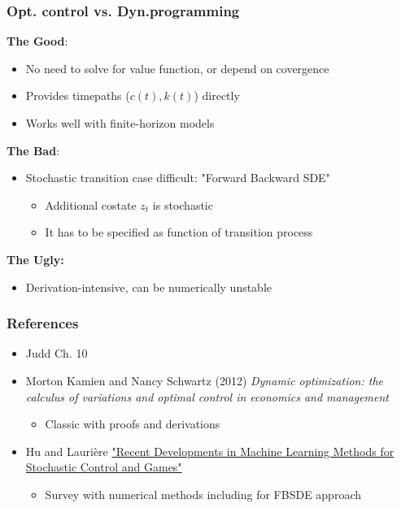\documentclass[bigger,handout]{beamer}
\begin{document}
 
\begin{frame}%
 
\frametitle{Opt. control vs. Dyn.programming}

\textbf{The Good}:

\begin{itemize}
\item No need to solve for value function, or depend on covergence

\item Provides timepaths ($c\left( t\right) ,k\left( t\right) $) directly

\item Works well with finite-horizon models
\end{itemize}

\textbf{The Bad}:

\begin{itemize}
\item Stochastic transition case difficult: "Forward Backward SDE"

\begin{itemize}
\item Additional costate $z_t$ is stochastic 

\item It has to be specified as function of transition process
\end{itemize}
\end{itemize}

\textbf{The Ugly:}

\begin{itemize}
\item Derivation-intensive, can be numerically unstable
\end{itemize}

 
 
\end{frame}

\begin{frame}%
 
\frametitle{References}

\begin{itemize}

\item Judd Ch. 10

\item Morton Kamien and Nancy Schwartz (2012) \emph{Dynamic optimization: the calculus of variations and optimal control in economics and management}
\begin{itemize}
\item Classic with proofs and derivations
\end{itemize}

\item Hu and Lauri\`{e}re \href{https://arxiv.org/abs/2303.10257}{"Recent Developments in Machine Learning Methods for Stochastic Control and Games"}
\begin{itemize}
\item Survey with numerical methods including for FBSDE approach
\end{itemize}

\end{itemize}

\end{frame}


 
\end{document}
